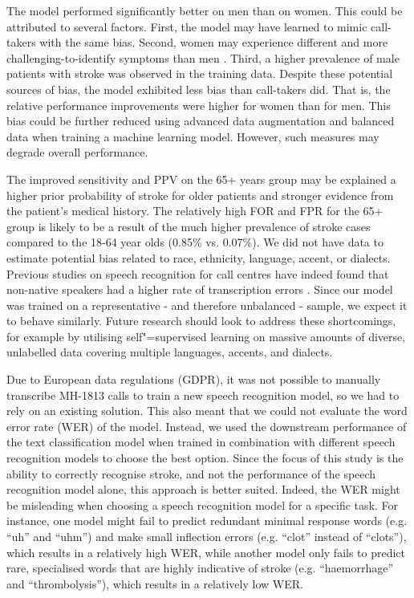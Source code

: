 {The model performed significantly better on men than on women. This could be attributed to several factors. First, the model may have learned to mimic call-takers with the same bias. Second, women may experience different and more challenging-to-identify symptoms than men \parencite{cite29, cite30}. Third, a higher prevalence of male patients with stroke was observed in the training data. Despite these potential sources of bias, the model exhibited less bias than call-takers did. That is, the relative performance improvements were higher for women than for men. This bias could be further reduced using advanced data augmentation and balanced data when training a machine learning model. However, such measures may degrade overall performance.

The improved sensitivity and PPV on the 65+ years group may be explained a higher prior probability of stroke for older patients and stronger evidence from the patient's medical history. The relatively high FOR and FPR for the 65+ group is likely to be a result of the much higher prevalence of stroke cases compared to the 18-64 year olds (0.85\% vs. 0.07\%). We did not have data to estimate potential bias related to race, ethnicity, language, accent, or dialects. Previous studies on speech recognition for call centres have indeed found that non-native speakers had a higher rate of transcription errors \parencite{han_deep_2017}. Since our model was trained on a representative - and therefore unbalanced - sample, we expect it to behave similarly. Future research should look to address these shortcomings, for example by utilising self"=supervised learning on massive amounts of diverse, unlabelled data covering multiple languages, accents, and dialects.

Due to European data regulations (GDPR), it was not possible to manually transcribe MH-1813 calls to train a new speech recognition model, so we had to rely on an existing solution. This also meant that we could not evaluate the word error rate (WER) of the model. Instead, we used the downstream performance of the text classification model when trained in combination with different speech recognition models to choose the best option. Since the focus of this study is the ability to correctly recognise stroke, and not the performance of the speech recognition model alone, this approach is better suited. Indeed, the WER might be misleading when choosing a speech recognition model for a specific task. For instance, one model might fail to predict redundant minimal response words (e.g. “uh” and “uhm”) and make small inflection errors (e.g. “clot” instead of “clots”), which results in a relatively high WER, while another model only fails to predict rare, specialised words that are highly indicative of stroke (e.g. “haemorrhage” and “thrombolysis”), which results in a relatively low WER.

}
